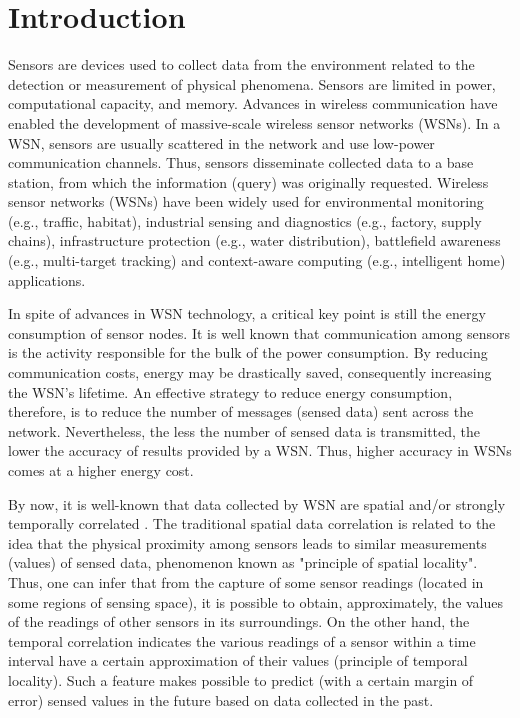 \documentclass{acm_proc_article-sp}
\begin{document}




\section{Introduction}


Sensors are devices used to collect data from the environment related to the
detection or measurement of physical phenomena. Sensors are limited in power,
computational capacity, and memory. Advances in wireless communication have
enabled the development of massive-scale wireless sensor networks (WSNs). In a
WSN, sensors are usually scattered in the network and use low-power
communication channels. Thus, sensors disseminate collected data to a base
station, from which the information (query) was originally requested. Wireless
sensor networks (WSNs) have been widely used for environmental monitoring (e.g.,
traffic, habitat), industrial sensing and diagnostics (e.g., factory, supply
chains), infrastructure protection (e.g., water distribution), battlefield
awareness (e.g., multi-target tracking) and context-aware computing (e.g.,
intelligent home) applications.

In spite of advances in WSN technology, a critical key point is still the
energy consumption of sensor nodes. It is well known that communication among
sensors is the activity responsible for the bulk of the power consumption. By
reducing communication costs, energy may be drastically saved, consequently
increasing the WSN's lifetime. An effective strategy to reduce energy
consumption, therefore, is to reduce the number of messages (sensed data) sent
across the network. Nevertheless, the less the number of sensed data is transmitted,
the lower the accuracy of results provided by a WSN. Thus, higher accuracy in
WSNs comes at a higher energy cost.
\vspace*{-.3cm}

By now, it is well-known that data collected by WSN are spatial and/or strongly
temporally correlated \cite{Chu2006, Villas2012, Yoon2005}. The traditional
spatial data correlation is related to the idea that the physical proximity
among sensors leads to similar measurements (values) of sensed data, phenomenon
known as "principle of spatial locality". Thus, one can infer that from the
capture of some sensor readings (located in some regions of sensing space), it
is possible to obtain, approximately, the values of the readings of other
sensors in its surroundings. On the other hand, the temporal correlation
indicates the various readings of a sensor within a time interval have a certain
approximation of their values (principle of temporal locality). Such a feature
makes possible to predict (with a certain margin of error) sensed values in the
future based on data collected in the past.
\vspace*{-.3cm}
\end{document}
